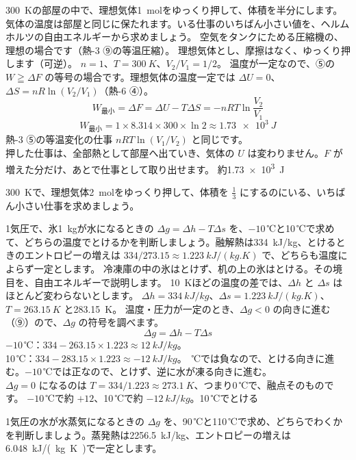 \label{ph:熱-10:ex11}
\begin{phreidai}
\qty{300}{K}の部屋の中で、理想気体\qty{1}{mol}をゆっくり押して、体積を半分にします。気体の温度は部屋と同じに保たれます。いる仕事のいちばん小さい値を、ヘルムホルツの自由エネルギーから求めましょう。
\phbamen
空気をタンクにためる圧縮機の、理想の場合です（熱-3 ⑨の等温圧縮）。
\phmushi
理想気体とし、摩擦はなく、ゆっくり押します（可逆）。
\phzu
$n=1$、$T=\qty{300}{K}$、$V_2/V_1=1/2$。
\phriyu
温度が一定なので、⑤の $W\geqq\Delta F$ の等号の場合です。理想気体の温度一定では $\Delta U=0$、$\Delta S=nR\ln(V_2/V_1)$（熱-6 ④）。
\phtateru
\[W_{\text{最小}}=\Delta F=\Delta U-T\Delta S=-nRT\ln\frac{V_2}{V_1}\]
\phtoku
\[W_{\text{最小}}=1\times8.314\times300\times\ln2\approx\qty{1.73e3}{J}\]
\phtashikame
熱-3 ⑤の等温変化の仕事 $nRT\ln(V_1/V_2)$ と同じです。\\
押した仕事は、全部熱として部屋へ出ていき、気体の $U$ は変わりません。$F$ が増えた分だけ、あとで仕事として取り出せます。
\kotae 約\qty{1.73e3}{J}
\end{phreidai}
\begin{jibun}
\qty{300}{K}で、理想気体\qty{2}{mol}をゆっくり押して、体積を $\tfrac13$ にするのにいる、いちばん小さい仕事を求めましょう。
\end{jibun}

\label{ph:熱-10:ex12}
\begin{phreidai}[氷は、なぜ0\,℃より上でとける？]
1気圧で、氷\qty{1}{kg}が水になるときの $\Delta g=\Delta h-T\Delta s$ を、$-10$\,℃と10\,℃で求めて、どちらの温度でとけるかを判断しましょう。融解熱は\qty{334}{kJ/kg}、とけるときのエントロピーの増えは $334/273.15\approx\qty{1.223}{kJ/(kg.K)}$ で、どちらも温度によらず一定とします。
\phbamen
冷凍庫の中の氷はとけず、机の上の氷はとける。その境目を、自由エネルギーで説明します。
\phmushi
\qty{10}{K}ほどの温度の差では、$\Delta h$ と $\Delta s$ はほとんど変わらないとします。
\phzu
$\Delta h=\qty{334}{kJ/kg}$、$\Delta s=\qty{1.223}{kJ/(kg.K)}$、$T=\qty{263.15}{K}$ と\qty{283.15}{K}。
\phriyu
温度・圧力が一定のとき、$\Delta g<0$ の向きに進む（⑨）ので、$\Delta g$ の符号を調べます。
\phtateru
\[\Delta g=\Delta h-T\Delta s\]
\phtoku
$-10$\,℃：$334-263.15\times1.223\approx\qty{+12}{kJ/kg}$。\\
10\,℃：$334-283.15\times1.223\approx\qty{-12}{kJ/kg}$。
\,℃では負なので、とける向きに進む。$-10$\,℃では正なので、とけず、逆に水が凍る向きに進む。\\
$\Delta g=0$ になるのは $T=334/1.223\approx\qty{273.1}{K}$、つまり0\,℃で、融点そのものです。
\kotae $-10$\,℃で約 $+12$、10\,℃で約 $\qty{-12}{kJ/kg}$。10\,℃でとける
\end{phreidai}
\begin{jibun}
1気圧の水が水蒸気になるときの $\Delta g$ を、90\,℃と110\,℃で求め、どちらでわくかを判断しましょう。蒸発熱は\qty{2256.5}{kJ/kg}、エントロピーの増えは\qty{6.048}{kJ/(kg.K)}で一定とします。
\end{jibun}

